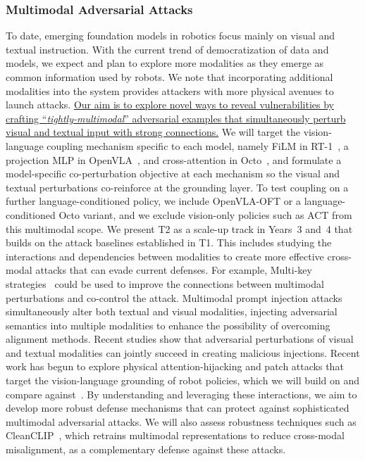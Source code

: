 \subsubsection{Multimodal Adversarial Attacks} \label{sec:t2_attacks}
To date, emerging foundation models in robotics focus mainly on visual and textual instruction. With the current trend of democratization of data and models, we expect and plan to explore more modalities as they emerge as common information used by robots.
We note that incorporating additional modalities into the system provides attackers with more physical avenues to launch attacks.
\ul{Our aim is to explore novel ways to reveal vulnerabilities by crafting ``\textit{tightly-multimodal}'' adversarial examples that simultaneously perturb visual and textual input with strong connections.} 
We will target the vision-language coupling mechanism specific to each model, namely FiLM in RT-1~\cite{rt-1}, a projection MLP in OpenVLA~\cite{kim2024openvla}, and cross-attention in Octo~\cite{team2024octo}, and formulate a model-specific co-perturbation objective at each mechanism so the visual and textual perturbations co-reinforce at the grounding layer. To test coupling on a further language-conditioned policy, we include OpenVLA-OFT or a language-conditioned Octo variant, and we exclude vision-only policies such as ACT from this multimodal scope. We present T2 as a scale-up track in Years~3 and~4 that builds on the attack baselines established in T1.
This includes studying the interactions and dependencies between modalities to create more effective cross-modal attacks that can evade current defenses. For example, Multi-key strategies~\cite{walmer2022dual} could be used to improve the connections between multimodal perturbations and co-control the attack.
Multimodal prompt injection attacks simultaneously alter both textual and visual modalities, injecting adversarial semantics into multiple modalities to enhance the possibility of overcoming alignment methods.
Recent studies \cite{qi2024visual,shayegani2023jailbreak} show that adversarial perturbations of visual and textual modalities can jointly succeed in creating malicious injections.
Recent work has begun to explore physical attention-hijacking and patch attacks that target the vision-language grounding of robot policies, which we will build on and compare against~\cite{zhang2026structure,yin2026vlaguard}.
By understanding and leveraging these interactions, we aim to develop more robust defense mechanisms that can protect against sophisticated multimodal adversarial attacks. We will also assess robustness techniques such as CleanCLIP~\cite{bansal2023cleanclip}, which retrains multimodal representations to reduce cross-modal misalignment, as a complementary defense against these attacks.
